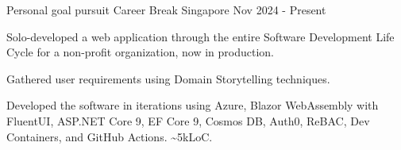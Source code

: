 
\begin{cventries}

\cventry
{Personal goal pursuit} %
{Career Break} %
{Singapore} %
{Nov 2024 - Present} %
{
  \begin{cvitems} %
    \item {Solo-developed a web application through the entire Software Development Life Cycle for a non-profit organization, now in production.}
    \item {Gathered user requirements using Domain Storytelling techniques.}
    \item {Developed the software in iterations using Azure, Blazor WebAssembly with FluentUI, ASP.NET Core 9, EF Core 9, Cosmos DB, Auth0, ReBAC, Dev Containers, and GitHub Actions. \textasciitilde5kLoC.}
  \end{cvitems}
}


\end{cventries}
